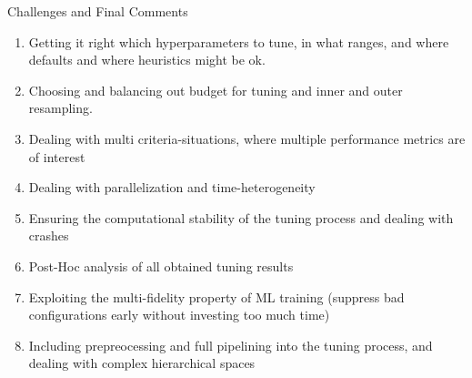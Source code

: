 
\begin{frame}[allowframebreaks]{Challenges and Final Comments}
\begin{enumerate}
  \item Getting it right which hyperparameters to tune, in what ranges, and where defaults and where heuristics might be ok.
  \item Choosing and balancing out budget for tuning and inner and outer resampling.
  \item Dealing with multi criteria-situations, where multiple performance metrics are of interest
  \item Dealing with parallelization and time-heterogeneity    
  \item Ensuring the computational stability of the tuning process and dealing with crashes
    
  \framebreak    

  \item Post-Hoc analysis of all obtained tuning results
  \item Exploiting the multi-fidelity property of ML training (suppress bad configurations early without investing too much time)
  \item Including prepreocessing and full pipelining into the tuning process, and dealing with complex hierarchical spaces
 \end{enumerate}

\end{frame}



